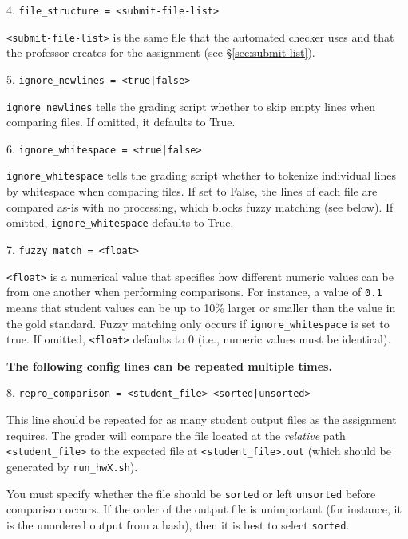 \documentclass[12pt]{article}
\begin{document}
\vspace{5pt}

4. \texttt{file\_structure = <submit-file-list>}

\texttt{<submit-file-list>} is the same file that the automated checker uses and that the professor creates for the assignment (see \S\ref{sec:submit-list}).

\vspace{5pt}

5. \texttt{ignore\_newlines = <true|false>}

\texttt{ignore\_newlines} tells the grading script whether to skip empty lines when comparing files. If omitted, it defaults to True.

\vspace{5pt}

6. \texttt{ignore\_whitespace = <true|false>}

\texttt{ignore\_whitespace} tells the grading script whether to tokenize individual lines by whitespace when comparing files. If set to False, the lines of each file are compared as-is with no processing, which blocks fuzzy matching (see below). If omitted, \texttt{ignore\_whitespace} defaults to True.

\vspace{5pt}

7. \texttt{fuzzy\_match = <float>}

\texttt{<float>} is a numerical value that specifies how different numeric values can be from one another when performing comparisons. For instance, a value of \texttt{0.1} means that student values can be up to 10\% larger or smaller than the value in the gold standard. Fuzzy matching only occurs if \texttt{ignore\_whitespace} is set to true. If omitted, \texttt{<float>} defaults to 0 (i.e., numeric values must be identical).

\vspace{5pt}

\noindent \textbf{The following config lines can be repeated multiple times.}

8. \texttt{repro\_comparison = <student\_file> <sorted|unsorted>}

This line should be repeated for as many student output files as the assignment requires. The grader will compare the file located at the \textit{relative} path \texttt{<student\_file>} to the expected file at \texttt{<student\_file>.out} (which should be generated by \texttt{run\_hwX.sh}).

You must specify whether the file should be \texttt{sorted} or left \texttt{unsorted} before comparison occurs. If the order of the output file is unimportant (for instance, it is the unordered output from a hash), then it is best to select \texttt{sorted}.
\end{document}
